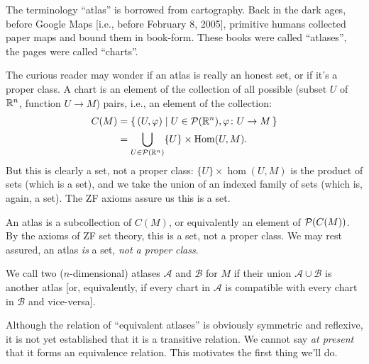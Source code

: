 \begin{remark}[Etymology]
The terminology ``atlas'' is borrowed from cartography. Back in the dark
ages, before Google Maps [i.e., before February 8, 2005], primitive humans collected paper maps and
bound them in book-form. These books were called ``atlases'', the pages
were called ``charts''.
\end{remark}

\begin{remark}\label{rmk:atlas:is-a-set}
The curious reader may wonder if an atlas is really an honest set, or if
it's a proper class. A chart is an element of the collection of all
possible (subset $U$ of $\mathbb{R}^{n}$, function $U\to M$) pairs, i.e., an
element of the collection:
\begin{equation}
\begin{split}
C(M) &= \{\,(U,\varphi)\mid U\in\mathcal{P}(\mathbb{R}^{n}),\varphi\colon U\to M\,\}\\
&=\bigcup_{U\in\mathcal{P}(\mathbb{R}^{n})}\{U\}\times\operatorname{Hom}(U,M).
\end{split}
\end{equation}
But this is clearly a set, not a proper class: $\{U\}\times\hom(U,M)$ is the
product of sets (which is a set), and we take the union of an indexed
family of sets (which is, again, a set). The ZF axioms assure us this is
a set.

An atlas is a subcollection of $C(M)$, or equivalently an element of
$\mathcal{P}(C(M))$. By the axioms of ZF
set theory, this is a set, not a proper class. We may rest assured, an
atlas \emph{is} a set, \emph{not a proper class}.
\end{remark}

\begin{definition}\label{defn:atlas:equivalence}
We call two ($n$-dimensional) atlases $\mathcal{A}$ and $\mathcal{B}$
for $M$  if their union $\mathcal{A}\cup\mathcal{B}$
is another atlas [or, equivalently, if every chart in $\mathcal{A}$ is
compatible with every chart in $\mathcal{B}$ and vice-versa].
\end{definition}

\begin{remark}
Although the relation of ``equivalent atlases'' is obviously symmetric
and reflexive, it is not yet established that it is a transitive relation.
We cannot say \emph{at present} that it forms an equivalence relation.
This motivates the first thing we'll do.
\end{remark}

